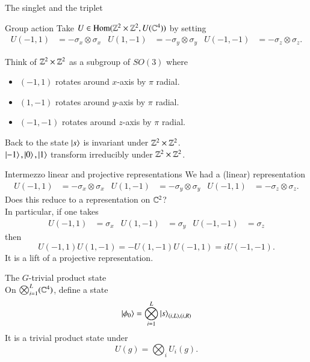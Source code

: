 \documentclass{beamer}
\begin{document}
\begin{frame}{The singlet and the triplet}
	\begin{block}{Group action}
		Take $U\in \textrm{Hom}(\mathbb{Z}^2\times \mathbb{Z}^2,U(\mathbb{C}^4))$ by setting
		\begin{align*}
		U(-1,1)&=-\sigma_x\otimes \sigma_x&U(1,-1)&=-\sigma_y\otimes \sigma_y&U(-1,-1)&=-\sigma_z\otimes \sigma_z.
		\end{align*}
	\end{block}
	Think of $\mathbb{Z}^2\times \mathbb{Z}^2$ as a subgroup of $SO(3)$ where
	\begin{itemize}
		\item $(-1,1)$ rotates around $x$-axis by $\pi$ radial.
		\item $(1,-1)$ rotates around $y$-axis by $\pi$ radial.
		\item $(-1,-1)$ rotates around $z$-axis by $\pi$ radial.
	\end{itemize}
	\pause
	\begin{block}{Back to the state}
		$\ket{s}$ is invariant under $\mathbb{Z}^2\times \mathbb{Z}^2$.\\
		$\ket{-1},\ket{0},\ket{1}$ transform irreducibly under $\mathbb{Z}^2\times \mathbb{Z}^2$.
	\end{block}
\end{frame}

\begin{frame}{Intermezzo linear and projective representations}
	We had a (linear) representation
	\begin{align*}
			U(-1,1)&=-\sigma_x\otimes \sigma_x&U(1,-1)&=-\sigma_y\otimes \sigma_y&U(-1,1)&=-\sigma_z\otimes \sigma_z.
	\end{align*}
	\pause
	Does this reduce to a representation on $\mathbb{C}^2$?\\
	\pause
	In particular, if one takes
	\begin{align}
		U(-1,1)&=\sigma_x&U(1,-1)&=\sigma_y&U(-1,-1)&=\sigma_z
	\end{align}
	then
	\begin{equation*}
		U(-1,1)U(1,-1)=-U(1,-1)U(-1,1)=i U(-1,-1).
	\end{equation*}
	It is a lift of a projective representation.
\end{frame}

\begin{frame}{The $G$-trivial product state}
	\\
	On $\bigotimes_{i=1}^L(\mathbb{C}^4)$, define a state
	\begin{equation*}
		\ket{\phi_0}=\bigotimes_{i=1}^L\ket{s}_{(i,L),(i,R)}
	\end{equation*}
	\pause
	It is a trivial product state under
	\begin{equation*}
		U(g)=\bigotimes_i U_i(g).
	\end{equation*}
\end{frame}
\end{document}

